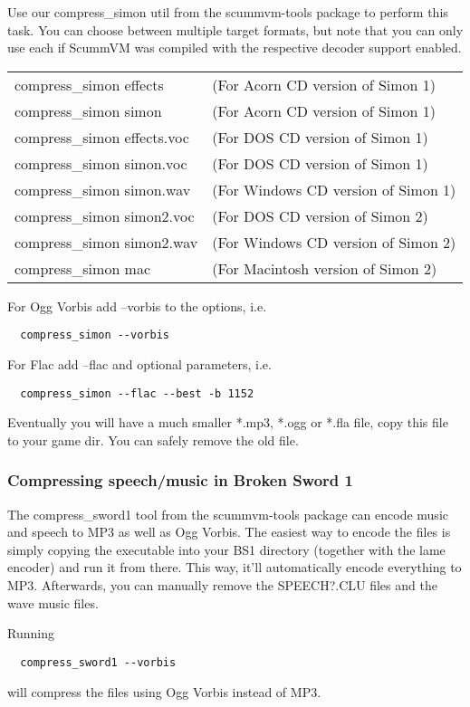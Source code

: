 Use our compress\_simon util from the scummvm-tools package to perform this task.
You can choose between multiple target formats, but note that you can only use
each if ScummVM was compiled with the respective decoder support enabled.

\begin{tabular}[h]{ll}
  compress\_simon effects    &(For Acorn CD version of Simon 1)\\
  compress\_simon simon      &(For Acorn CD version of Simon 1)\\
  compress\_simon effects.voc&(For DOS CD version of Simon 1)\\
  compress\_simon simon.voc  &(For DOS CD version of Simon 1)\\
  compress\_simon simon.wav  &(For Windows CD version of Simon 1)\\
  compress\_simon simon2.voc &(For DOS CD version of Simon 2)\\
  compress\_simon simon2.wav &(For Windows CD version of Simon 2)\\
  compress\_simon mac        &(For Macintosh version of Simon 2)\\
\end{tabular}

For Ogg Vorbis add --vorbis to the options, i.e.
\begin{verbatim}
  compress_simon --vorbis
\end{verbatim}
%
For Flac add --flac and optional parameters, i.e.
\begin{verbatim}
  compress_simon --flac --best -b 1152
\end{verbatim}
%
Eventually you will have a much smaller *.mp3, *.ogg or *.fla file, copy this
file to your game dir. You can safely remove the old file.

\subsubsection{Compressing speech/music in Broken Sword 1}

The compress\_sword1 tool from the scummvm-tools package can encode music and
speech to MP3 as well as Ogg Vorbis.
The easiest way to encode the files is simply copying the executable into your
BS1 directory (together with the lame encoder) and run it from there.
This way, it'll automatically encode everything to MP3.
Afterwards, you can manually remove the SPEECH?.CLU files and the wave music
files.

Running
\begin{verbatim}
  compress_sword1 --vorbis
\end{verbatim}
%
will compress the files using Ogg Vorbis instead of MP3.

